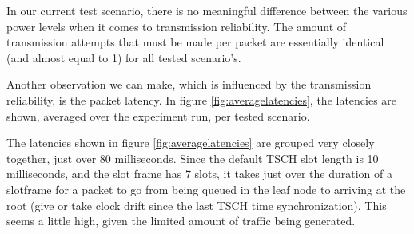 \documentclass[conference]{IEEEtran}
\begin{document}
In our current test scenario, there is no meaningful difference between the various power levels when it comes to transmission reliability. The amount of transmission attempts that must be made per packet are essentially identical (and almost equal to 1) for all tested scenario's. 

Another observation we can make, which is influenced by the transmission reliability, is the packet latency. In figure \ref{fig:averagelatencies}, the latencies are shown, averaged over the experiment run, per tested scenario. 

The latencies shown in figure \ref{fig:averagelatencies} are grouped very closely together, just over 80 milliseconds. Since the default TSCH slot length is 10 milliseconds, and the slot frame has 7 slots, it takes just over the duration of a slotframe for a packet to go from being queued in the leaf node to arriving at the root (give or take clock drift since the last TSCH time synchronization). This seems a little high, given the limited amount of traffic being generated. 
\end{document}
